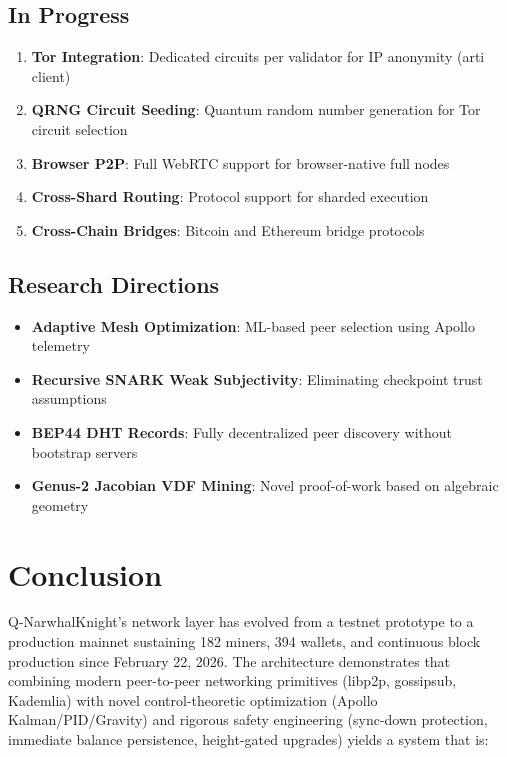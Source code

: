 \documentclass[11pt,a4paper]{article}
\begin{document}
\subsection{In Progress}

\begin{enumerate}
    \item \textbf{Tor Integration}: Dedicated circuits per validator for IP anonymity (arti client)
    \item \textbf{QRNG Circuit Seeding}: Quantum random number generation for Tor circuit selection
    \item \textbf{Browser P2P}: Full WebRTC support for browser-native full nodes
    \item \textbf{Cross-Shard Routing}: Protocol support for sharded execution
    \item \textbf{Cross-Chain Bridges}: Bitcoin and Ethereum bridge protocols
\end{enumerate}

\subsection{Research Directions}

\begin{itemize}
    \item \textbf{Adaptive Mesh Optimization}: ML-based peer selection using Apollo telemetry
    \item \textbf{Recursive SNARK Weak Subjectivity}: Eliminating checkpoint trust assumptions
    \item \textbf{BEP44 DHT Records}: Fully decentralized peer discovery without bootstrap servers
    \item \textbf{Genus-2 Jacobian VDF Mining}: Novel proof-of-work based on algebraic geometry
\end{itemize}

\section{Conclusion}

Q-NarwhalKnight's network layer has evolved from a testnet prototype to a production mainnet sustaining 182 miners, 394 wallets, and continuous block production since February 22, 2026. The architecture demonstrates that combining modern peer-to-peer networking primitives (libp2p, gossipsub, Kademlia) with novel control-theoretic optimization (Apollo Kalman/PID/Gravity) and rigorous safety engineering (sync-down protection, immediate balance persistence, height-gated upgrades) yields a system that is:
\end{document}

